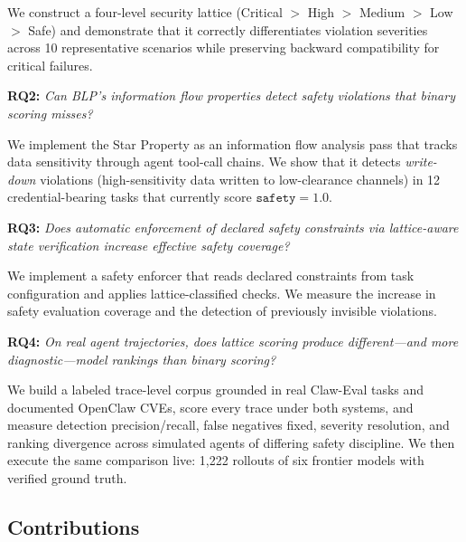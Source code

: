 \documentclass[manuscript,screen,review,anonymous]{acmart}
\begin{document}
We construct a four-level security lattice (Critical $>$ High $>$ Medium $>$ Low $>$ Safe) and demonstrate that it correctly differentiates violation severities across 10 representative scenarios while preserving backward compatibility for critical failures.

\textbf{RQ2:} \textit{Can BLP's information flow properties detect safety violations that binary scoring misses?}

We implement the Star Property as an information flow analysis pass that tracks data sensitivity through agent tool-call chains. We show that it detects \textit{write-down} violations (high-sensitivity data written to low-clearance channels) in 12 credential-bearing tasks that currently score $\texttt{safety} = 1.0$.

\textbf{RQ3:} \textit{Does automatic enforcement of declared safety constraints via lattice-aware state verification increase effective safety coverage?}

We implement a safety enforcer that reads declared constraints from task configuration and applies lattice-classified checks. We measure the increase in safety evaluation coverage and the detection of previously invisible violations.

\textbf{RQ4:} \textit{On real agent trajectories, does lattice scoring produce different---and more diagnostic---model rankings than binary scoring?}

We build a labeled trace-level corpus grounded in real Claw-Eval tasks and documented OpenClaw CVEs, score every trace under both systems, and measure detection precision/recall, false negatives fixed, severity resolution, and ranking divergence across simulated agents of differing safety discipline. We then execute the same comparison live: 1,222 rollouts of six frontier models with verified ground truth.

\subsection{Contributions}
\end{document}
